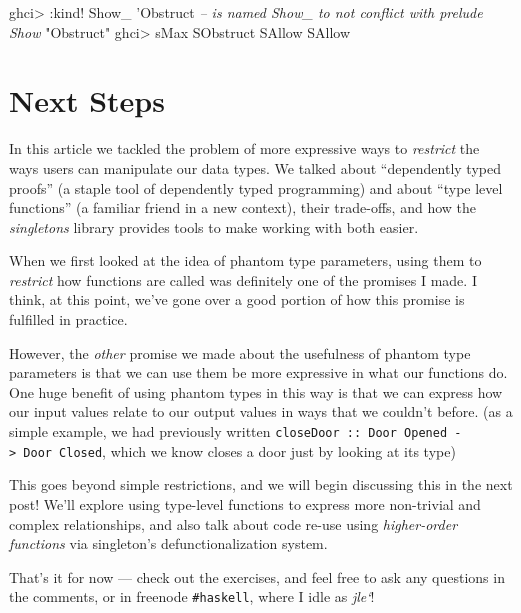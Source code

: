 \documentclass[]{article}
\newenvironment{Shaded}{}{}
\newcommand{\CommentTok}[1]{\textcolor[rgb]{0.38,0.63,0.69}{\textit{#1}}}
\newcommand{\DataTypeTok}[1]{\textcolor[rgb]{0.56,0.13,0.00}{#1}}
\newcommand{\FunctionTok}[1]{\textcolor[rgb]{0.02,0.16,0.49}{#1}}
\newcommand{\NormalTok}[1]{#1}
\newcommand{\StringTok}[1]{\textcolor[rgb]{0.25,0.44,0.63}{#1}}
\begin{document}
\begin{Shaded}
\begin{Highlighting}[]
\NormalTok{ghci}\FunctionTok{>} \FunctionTok{:}\NormalTok{kind}\FunctionTok{!} \DataTypeTok{Show_}\NormalTok{ '}\DataTypeTok{Obstruct}      \CommentTok{-- is named Show_ to not conflict with prelude Show}
\StringTok{"Obstruct"}
\NormalTok{ghci}\FunctionTok{>}\NormalTok{ sMax }\DataTypeTok{SObstruct} \DataTypeTok{SAllow}
\DataTypeTok{SAllow}
\end{Highlighting}
\end{Shaded}

\hypertarget{next-steps}{%
\section{Next Steps}\label{next-steps}}

In this article we tackled the problem of more expressive ways to
\emph{restrict} the ways users can manipulate our data types. We talked about
``dependently typed proofs'' (a staple tool of dependently typed programming)
and about ``type level functions'' (a familiar friend in a new context), their
trade-offs, and how the \emph{singletons} library provides tools to make working
with both easier.

When we first looked at the idea of phantom type parameters, using them to
\emph{restrict} how functions are called was definitely one of the promises I
made. I think, at this point, we've gone over a good portion of how this promise
is fulfilled in practice.

However, the \emph{other} promise we made about the usefulness of phantom type
parameters is that we can use them be more expressive in what our functions do.
One huge benefit of using phantom types in this way is that we can express how
our input values relate to our output values in ways that we couldn't before.
(as a simple example, we had previously written
\texttt{closeDoor\ ::\ Door\ \textquotesingle{}Opened\ -\textgreater{}\ Door\ \textquotesingle{}Closed},
which we know closes a door just by looking at its type)

This goes beyond simple restrictions, and we will begin discussing this in the
next post! We'll explore using type-level functions to express more non-trivial
and complex relationships, and also talk about code re-use using
\emph{higher-order functions} via singleton's defunctionalization system.

That's it for now --- check out the exercises, and feel free to ask any
questions in the comments, or in freenode \texttt{\#haskell}, where I idle as
\emph{jle`}!
\end{document}
